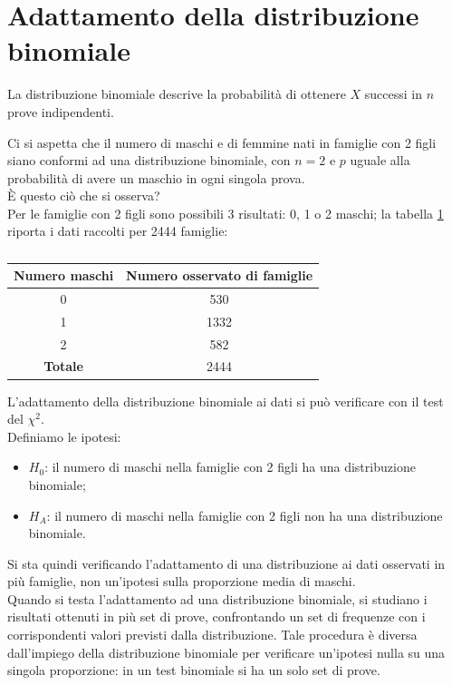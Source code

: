\documentclass[10pt, draft]{book}
\newcommand{\tightlist}{%
\setlength{\itemsep}{1pt}\setlength{\parskip}{0pt}\setlength{\parsep}{0pt}}
\newcounter{example}[section]
\begin{document}
\section{Adattamento della distribuzione binomiale}

La distribuzione binomiale descrive la probabilità di ottenere $X$ successi in $n$ prove indipendenti.

\begin{example}
Ci si aspetta che il numero di maschi e di femmine nati in famiglie con 2 figli siano conformi ad una distribuzione binomiale, con $n =2$ e $p$ uguale alla probabilità di avere un maschio in ogni singola prova.
\\
È questo ciò che si osserva?
\\
Per le famiglie con 2 figli sono possibili 3 risultati: 0, 1 o 2 maschi; la tabella \ref{tabmaschi} riporta i dati raccolti per 2444 famiglie:
    \begin{table}[H]
        \centering
        \renewcommand\arraystretch{1.2}
        \begin{tabular}{c|c}
        \hline
        \textbf{Numero maschi} & \textbf{Numero osservato di famiglie} \\
        \hline
        0 & 530 \\
        1 & 1332 \\
        2 & 582 \\
        \hline
        \textbf{Totale} & 2444 \\
        \hline
        \end{tabular}
        \caption{}
        \label{tabmaschi}
    \end{table}\noindent
    L'adattamento della distribuzione binomiale ai dati si può verificare con il test del $\chi^2$.
    \\
Definiamo le ipotesi:
    \begin{itemize} \tightlist
    \item $H_0$: il numero di maschi nella famiglie con 2 figli ha una distribuzione binomiale;
    \item $H_A$: il numero di maschi nella famiglie con 2 figli non ha una distribuzione binomiale.
    \end{itemize}
    Si sta quindi verificando l'adattamento di una distribuzione ai dati osservati in più famiglie, non un'ipotesi sulla proporzione media di maschi.
    \\
    Quando si testa l'adattamento ad una distribuzione binomiale, si studiano i risultati ottenuti in più set di prove, confrontando un set di frequenze con i corrispondenti valori previsti dalla distribuzione. Tale procedura è diversa dall'impiego della distribuzione binomiale per verificare un'ipotesi nulla su una singola proporzione: in un test binomiale si ha un solo set di prove.

\end{example}
\end{document}
